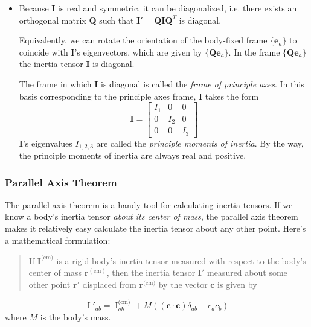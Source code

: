 \documentclass[11pt, a4paper]{article}
\newcommand{\e}{\mathbf{e}} %
\newcommand{\mat}[1]{\mathbf{#1}} %
\begin{document}
\begin{itemize}
	\item Because $ \mathbf{I} $ is real and symmetric, it can be diagonalized, i.e. there exists an orthogonal matrix $ \mathbf{Q} $ such that $ \mathbf{I}' = \mathbf{Q} \mathbf{I} \mathbf{Q}^{T} $ is diagonal.
	
	Equivalently, we can rotate the orientation of the body-fixed frame $ \{\e_{a} \} $ to coincide with $ \mathbf{I} $'s eigenvectors, which are given by $\{ \mathbf{Q}\e_{a} \} $. In the frame $ \{\mat{Q}\e_{a} \} $ the inertia tensor $ \mathbf{I} $ is diagonal.
	
	The frame in which $ \mathbf{I} $ is diagonal is called the \textit{frame of principle axes}. In this basis corresponding to the principle axes frame, $ \mathbf{I} $ takes the form
	\[
		\mathbf{I} = 
		\begin{bmatrix}
			I_{1} & 0 & 0\\
			0 & I_{2} & 0\\
			0 & 0 & I_{3}
		\end{bmatrix}
	\]
	$ \mathbf{I} $'s eigenvalues $ I_{1, 2, 3} $ are called the \textit{principle moments of inertia}. By the way, the principle moments of inertia are always real and positive.

\end{itemize}

\subsubsection{Parallel Axis Theorem}
The parallel axis theorem is a handy tool for calculating inertia tensors. If we know a body's inertia tensor \textit{about its center of mass}, the parallel axis theorem makes it relatively easy calculate the inertia tensor about any other point. Here's a mathematical formulation:

\begin{quote}
	If $ \mathbf{I}^{\text{(cm)}} $ is a rigid body's inertia tensor measured with respect to the body's center of mass $ \bm{r}^{(\text{cm})} $, then the inertia tensor $ \mathbf{I}' $ measured about some other point $ \bm{r}' $ displaced from $ \bm{r}^{\text{(cm)}} $ by the vector $ \bm{c} $ is given by
\end{quote}
\begin{equation*}
	\operatorname{I}'_{ab} = \operatorname{I}^{\text{(cm)}}_{ab} + M ((\bm{c}\cdot \bm{c} ) \delta_{ab} - c_{a} c_{b} )
\end{equation*}
where $ M $ is the body's mass.
\smallskip
\end{document}
